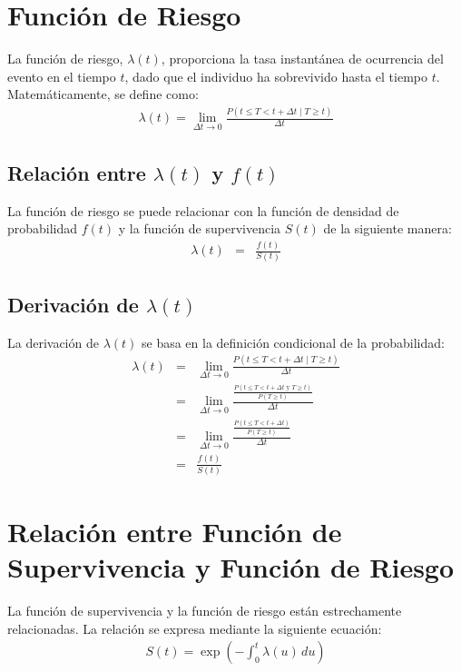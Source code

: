 \documentclass[a4paper]{report} %
\begin{document}
\section{Funci\'on de Riesgo}
La funci\'on de riesgo, $\lambda(t)$, proporciona la tasa instant\'anea de ocurrencia del evento en el tiempo $t$, dado que el individuo ha sobrevivido hasta el tiempo $t$. Matem\'aticamente, se define como:
\begin{eqnarray*}
\lambda(t) = \lim_{\Delta t \to 0} \frac{P(t \leq T < t + \Delta t \mid T \geq t)}{\Delta t}
\end{eqnarray*}

\subsection{Relaci\'on entre $\lambda(t)$ y $f(t)$}
La funci\'on de riesgo se puede relacionar con la funci\'on de densidad de probabilidad $f(t)$ y la funci\'on de supervivencia $S(t)$ de la siguiente manera:
\begin{eqnarray*}
\lambda(t) &=& \frac{f(t)}{S(t)}
\end{eqnarray*}

\subsection{Derivaci\'on de $\lambda(t)$}
La derivaci\'on de $\lambda(t)$ se basa en la definici\'on condicional de la probabilidad:
\begin{eqnarray*}
\lambda(t) &=& \lim_{\Delta t \to 0} \frac{P(t \leq T < t + \Delta t \mid T \geq t)}{\Delta t} \\
           &=& \lim_{\Delta t \to 0} \frac{\frac{P(t \leq T < t + \Delta t \text{ y } T \geq t)}{P(T \geq t)}}{\Delta t} \\
           &=& \lim_{\Delta t \to 0} \frac{\frac{P(t \leq T < t + \Delta t)}{P(T \geq t)}}{\Delta t} \\
           &=& \frac{f(t)}{S(t)}
\end{eqnarray*}

\section{Relaci\'on entre Funci\'on de Supervivencia y Funci\'on de Riesgo}
La funci\'on de supervivencia y la funci\'on de riesgo est\'an estrechamente relacionadas. La relaci\'on se expresa mediante la siguiente ecuaci\'on:
\begin{eqnarray*}
S(t) = \exp\left(-\int_0^t \lambda(u) \, du\right)
\end{eqnarray*}
\end{document}
